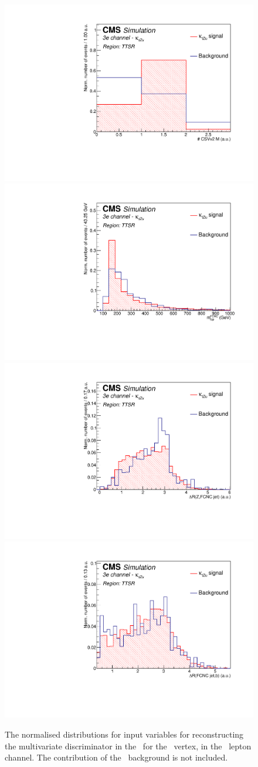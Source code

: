\begin{figure}[htbp]
	\includegraphics[width=0.3\linewidth]{6_Search/Figures/PlotsTechnics/NJets_CSVv2MZuttoppaireee_norm}
	\includegraphics[width=0.3\linewidth]{6_Search/Figures/PlotsTechnics/FCNCtop_MZuttoppaireee_norm}
	\includegraphics[width=0.3\linewidth]{6_Search/Figures/PlotsTechnics/dRZcZuttoppaireee_norm}
	\includegraphics[width=0.3\linewidth]{6_Search/Figures/PlotsTechnics/dRSMjetLightjetZuttoppaireee_norm}
	\caption{The normalised distributions for input variables for reconstructing the multivariate discriminator in the \TTSR\ for the \Zut\ vertex, in the \eee\ lepton channel. The contribution of the \NPL\ background is not included.}
	\label{fig:toppairZutnormalizedeee}
\end{figure}




\clearpage

